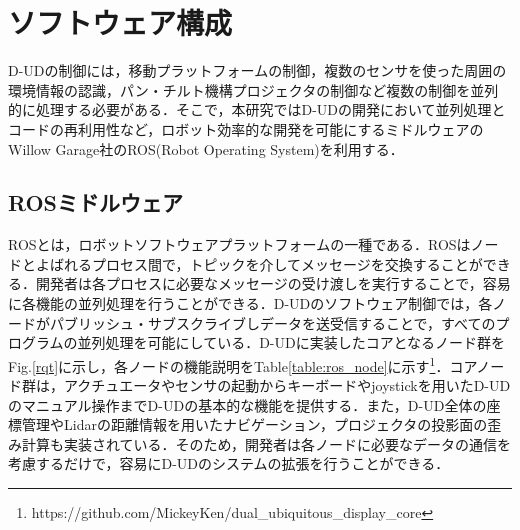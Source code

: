 \documentclass[12pt]{sonota/aislab}
\begin{document}


\section{ソフトウェア構成}
D-UDの制御には，移動プラットフォームの制御，複数のセンサを使った周囲の環境情報の認識，パン・チルト機構プロジェクタの制御など複数の制御を並列的に処理する必要がある．そこで，本研究ではD-UDの開発において並列処理とコードの再利用性など，ロボット効率的な開発を可能にするミドルウェアのWillow Garage社のROS(Robot Operating System)\cite{ROS}を利用する．

\subsection{ROSミドルウェア}
ROSとは，ロボットソフトウェアプラットフォームの一種である．ROSはノードとよばれるプロセス間で，トピックを介してメッセージを交換することができる．開発者は各プロセスに必要なメッセージの受け渡しを実行することで，容易に各機能の並列処理を行うことができる．D-UDのソフトウェア制御では，各ノードがパブリッシュ・サブスクライブしデータを送受信することで，すべてのプログラムの並列処理を可能にしている．D-UDに実装したコアとなるノード群をFig.\ref{rqt}に示し，各ノードの機能説明をTable\ref{table:ros_node}に示す\footnote{https://github.com/MickeyKen/dual\_ubiquitous\_display\_core}．コアノード群は，アクチュエータやセンサの起動からキーボードやjoystickを用いたD-UDのマニュアル操作までD-UDの基本的な機能を提供する．また，D-UD全体の座標管理やLidarの距離情報を用いたナビゲーション，プロジェクタの投影面の歪み計算も実装されている．そのため，開発者は各ノードに必要なデータの通信を考慮するだけで，容易にD-UDのシステムの拡張を行うことができる．
\end{document}
